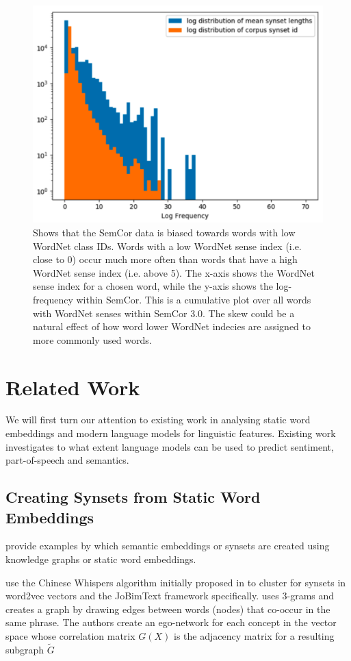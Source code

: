 \documentclass[a4paper,12pt,oneside,openright]{report}
\begin{document}
\begin{figure}[h]
	\center
  \includegraphics[width=0.6\linewidth]{./assets/background/semcor_skew.png}
  \caption{Shows that the SemCor data is biased towards words with low WordNet class IDs. 
  Words with a low WordNet sense index (i.e. close to 0) occur much more often than words that have a high WordNet sense index (i.e. above 5).
  The x-axis shows the WordNet sense index for a chosen word, while the y-axis shows the log-frequency within SemCor. 
  This is a cumulative plot over all words with WordNet senses within SemCor 3.0.
  The skew could be a natural effect of how word lower WordNet indecies are assigned to more commonly used words.
  }
  \label{fig:embeddings_by_language}
\end{figure}


\chapter{Related Work}\label{section:RelatedWork} 


We will first turn our attention to existing work in analysing static word embeddings and modern language models for linguistic features.
Existing work investigates to what extent language models can be used to predict sentiment, part-of-speech and semantics.

\section{Creating Synsets from Static Word Embeddings}\label{section_clustering}

\cite{pelevina16, biemann13, remus18, arefyev19, denkowski09} provide examples by which semantic embeddings or synsets are created using knowledge graphs or static word embeddings.

\cite{pelevina16, biemann13} use the Chinese Whispers algorithm initially proposed in \cite{biemann06} to cluster for synsets in word2vec vectors and the JoBimText framework \cite{biemann13} specifically.
\cite{denkowski09} uses 3-grams and creates a graph by drawing edges between words (nodes) that co-occur in the same phrase.
The authors create an ego-network for each concept in the vector space whose correlation matrix $G(X)$ is the adjacency matrix for a resulting subgraph $\tilde{G}$
\end{document}
